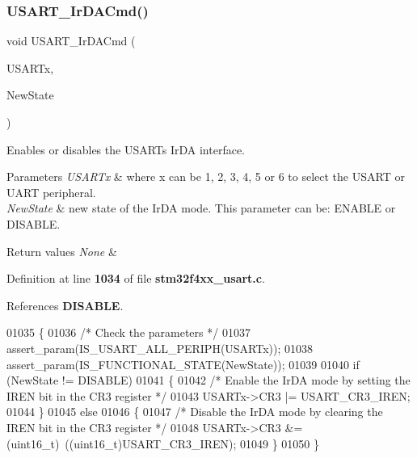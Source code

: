 \subsubsection{U\+S\+A\+R\+T\+\_\+\+Ir\+D\+A\+Cmd()}
{\footnotesize\ttfamily void U\+S\+A\+R\+T\+\_\+\+Ir\+D\+A\+Cmd (\begin{DoxyParamCaption}\item[{\textbf{ U\+S\+A\+R\+T\+\_\+\+Type\+Def} $\ast$}]{U\+S\+A\+R\+Tx,  }\item[{\textbf{ Functional\+State}}]{New\+State }\end{DoxyParamCaption})}



Enables or disables the U\+S\+A\+RT\textquotesingle{}s Ir\+DA interface. 


\begin{DoxyParams}{Parameters}
{\em U\+S\+A\+R\+Tx} & where x can be 1, 2, 3, 4, 5 or 6 to select the U\+S\+A\+RT or U\+A\+RT peripheral. \\
\hline
{\em New\+State} & new state of the Ir\+DA mode. This parameter can be\+: E\+N\+A\+B\+LE or D\+I\+S\+A\+B\+LE. \\
\hline
\end{DoxyParams}

\begin{DoxyRetVals}{Return values}
{\em None} & \\
\hline
\end{DoxyRetVals}


Definition at line \textbf{ 1034} of file \textbf{ stm32f4xx\+\_\+usart.\+c}.



References \textbf{ D\+I\+S\+A\+B\+LE}.


\begin{DoxyCode}
01035 \{
01036   \textcolor{comment}{/* Check the parameters */}
01037   assert_param(IS_USART_ALL_PERIPH(USARTx));
01038   assert_param(IS_FUNCTIONAL_STATE(NewState));
01039     
01040   \textcolor{keywordflow}{if} (NewState != DISABLE)
01041   \{
01042     \textcolor{comment}{/* Enable the IrDA mode by setting the IREN bit in the CR3 register */}
01043     USARTx->CR3 |= USART_CR3_IREN;
01044   \}
01045   \textcolor{keywordflow}{else}
01046   \{
01047     \textcolor{comment}{/* Disable the IrDA mode by clearing the IREN bit in the CR3 register */}
01048     USARTx->CR3 &= (uint16\_t)~((uint16\_t)USART_CR3_IREN);
01049   \}
01050 \}
\end{DoxyCode}
\mbox{\label{group__USART__Group7_ga81a0cd36199040bf6d266b57babd678e}} 
